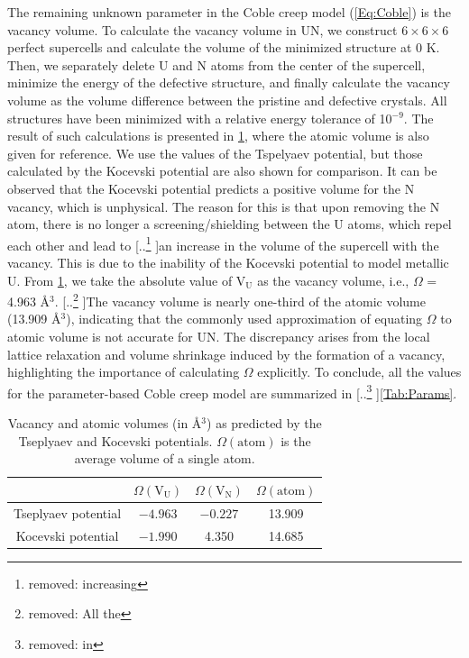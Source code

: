 \documentclass[preprint,12pt,sort&compress]{elsarticle} %
\newcommand{\?}{\stackrel{?}{=}}
\providecommand{\DIFaddtex}[1]{{\sf #1}} %
\providecommand{\DIFdeltex}[1]{{[..\footnote{removed: #1} ]}} %
\providecommand{\DIFaddbegin}{\protect\color{blue}} %
\providecommand{\DIFaddend}{\protect\color{black}} %
\providecommand{\DIFdelbegin}{\protect\color{red}} %
\providecommand{\DIFdelend}{\protect\color{black}} %
\providecommand{\DIFadd}[1]{\texorpdfstring{\DIFaddtex{#1}}{#1}} %
\providecommand{\DIFdel}[1]{\texorpdfstring{\DIFdeltex{#1}}{}} %
\newcommand{\DIFscaledelfig}{0.5}
\newlength{\DIFdelgraphicswidth} %
\newlength{\DIFdelgraphicsheight} %
\newcommand{\DIFaddincludegraphics}[2][]{{\color{blue}\fbox{\DIFOincludegraphics[#1]{#2}}}} %
\newcommand{\DIFdelincludegraphics}[2][]{%
\sbox{\DIFdelgraphicsbox}{\DIFOincludegraphics[#1]{#2}}%
\settoboxwidth{\DIFdelgraphicswidth}{\DIFdelgraphicsbox} %
\settoboxtotalheight{\DIFdelgraphicsheight}{\DIFdelgraphicsbox} %
\scalebox{\DIFscaledelfig}{%
\parbox[b]{\DIFdelgraphicswidth}{\usebox{\DIFdelgraphicsbox}\\[-\baselineskip] \rule{\DIFdelgraphicswidth}{0em}}\llap{\resizebox{\DIFdelgraphicswidth}{\DIFdelgraphicsheight}{%
\setlength{\unitlength}{\DIFdelgraphicswidth}%
\begin{picture}(1,1)%
\thicklines\linethickness{2pt} %
{\color[rgb]{1,0,0}\put(0,0){\framebox(1,1){}}}%
{\color[rgb]{1,0,0}\put(0,0){\line( 1,1){1}}}%
{\color[rgb]{1,0,0}\put(0,1){\line(1,-1){1}}}%
\end{picture}%
}\hspace*{3pt}}} %
} %
\DeclareRobustCommand{\DIFaddbegin}{\DIFOaddbegin \let\includegraphics\DIFaddincludegraphics} %
\DeclareRobustCommand{\DIFaddend}{\DIFOaddend \let\includegraphics\DIFOincludegraphics} %
\DeclareRobustCommand{\DIFdelbegin}{\DIFOdelbegin \let\includegraphics\DIFdelincludegraphics} %
\DeclareRobustCommand{\DIFdelend}{\DIFOaddend \let\includegraphics\DIFOincludegraphics} %
\begin{document}
The remaining unknown parameter in the Coble creep model (\cref{Eq:Coble}) is the vacancy volume. To calculate the vacancy volume in UN, we construct $6 \times 6 \times 6$ perfect supercells and calculate the volume of the minimized structure at 0 K. Then, we separately delete U and N atoms from the center of the supercell, minimize the energy of the defective structure, and finally calculate the vacancy volume as the volume difference between the pristine and defective crystals. All structures have been minimized with a relative energy tolerance of 10$^{-9}$. The result of such calculations is presented in \cref{Tab:VacancyVolume}, where the atomic volume is also given for reference. We use the values of the Tspelyaev potential, but those calculated by the Kocevski potential are also shown for comparison. It can be observed that the Kocevski potential predicts a positive volume for the N vacancy, which is unphysical. The reason for this is that upon removing the N atom, there is no longer a screening/shielding between the U atoms, which repel each other and lead to \DIFdelbegin \DIFdel{increasing }\DIFdelend \DIFaddbegin \DIFadd{an increase in }\DIFaddend the volume of the supercell with the vacancy. This is due to the inability of the Kocevski potential to model metallic U. From \cref{Tab:VacancyVolume}, we take the absolute value of $\text{V}_\text{U}$ as the vacancy volume, i.e., $\Omega$ = 4.963 \AA$^3$. \DIFdelbegin \DIFdel{All the }\DIFdelend \DIFaddbegin \DIFadd{The vacancy volume is nearly one-third of the atomic volume (13.909 }{\DIFadd{\AA$^3$}}\DIFadd{), indicating that the commonly used approximation of equating $\Omega$ to atomic volume \cite{Courtney2005} is not accurate for UN. The discrepancy arises from the local lattice relaxation and volume shrinkage induced by the formation of a vacancy, highlighting the importance of calculating $\Omega$ explicitly.
To conclude, all the }\DIFaddend values for the parameter-based Coble creep model are summarized in \DIFdelbegin \DIFdel{in }\DIFdelend \cref{Tab:Params}.

\begin{table}[h!]
\centering
\caption{Vacancy and atomic volumes (in \AA$^3$) as predicted by the Tseplyaev and Kocevski potentials. $\Omega(\mathrm{atom})$ is the average volume of a single atom.}
\footnotesize
\begin{tabular}{cccc}
\hline
                    & $\Omega(\mathrm{V}_\mathrm{U})$ & $\Omega(\mathrm{V}_\mathrm{N})$  & $\Omega(\mathrm{atom})$ \\
\hline
Tseplyaev potential & $-4.963$      & $-0.227$       & 13.909 \\
Kocevski potential  & $-1.990$      & 4.350          & 14.685 \\
\hline
\end{tabular}
\label{Tab:VacancyVolume}
\end{table}
\end{document}
